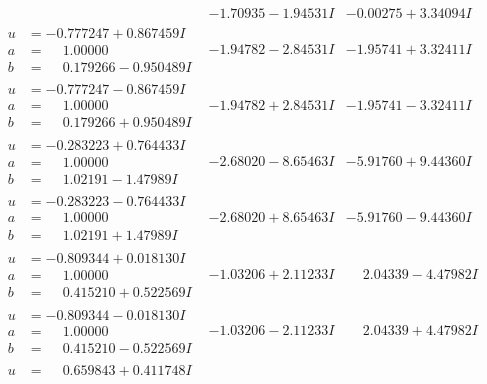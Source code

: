 \documentclass[1p]{elsarticle_modified}
\theoremstyle{definition}
\begin{document}
$$\begin{array}{c|c|c}
 & -1.70935 - 1.94531 I & -0.00275 + 3.34094 I \\ \hline\begin{aligned}
u &= -0.777247 + 0.867459 I \\
a &= \phantom{-}1.00000\phantom{ +0.000000I} \\
b &= \phantom{-}0.179266 - 0.950489 I\end{aligned}
 & -1.94782 - 2.84531 I & -1.95741 + 3.32411 I \\ \hline\begin{aligned}
u &= -0.777247 - 0.867459 I \\
a &= \phantom{-}1.00000\phantom{ +0.000000I} \\
b &= \phantom{-}0.179266 + 0.950489 I\end{aligned}
 & -1.94782 + 2.84531 I & -1.95741 - 3.32411 I \\ \hline\begin{aligned}
u &= -0.283223 + 0.764433 I \\
a &= \phantom{-}1.00000\phantom{ +0.000000I} \\
b &= \phantom{-}1.02191 - 1.47989 I\end{aligned}
 & -2.68020 - 8.65463 I & -5.91760 + 9.44360 I \\ \hline\begin{aligned}
u &= -0.283223 - 0.764433 I \\
a &= \phantom{-}1.00000\phantom{ +0.000000I} \\
b &= \phantom{-}1.02191 + 1.47989 I\end{aligned}
 & -2.68020 + 8.65463 I & -5.91760 - 9.44360 I \\ \hline\begin{aligned}
u &= -0.809344 + 0.018130 I \\
a &= \phantom{-}1.00000\phantom{ +0.000000I} \\
b &= \phantom{-}0.415210 + 0.522569 I\end{aligned}
 & -1.03206 + 2.11233 I & \phantom{-}2.04339 - 4.47982 I \\ \hline\begin{aligned}
u &= -0.809344 - 0.018130 I \\
a &= \phantom{-}1.00000\phantom{ +0.000000I} \\
b &= \phantom{-}0.415210 - 0.522569 I\end{aligned}
 & -1.03206 - 2.11233 I & \phantom{-}2.04339 + 4.47982 I \\ \hline\begin{aligned}
u &= \phantom{-}0.659843 + 0.411748 I \\

\end{aligned}
\end{array}$$
\end{document}
